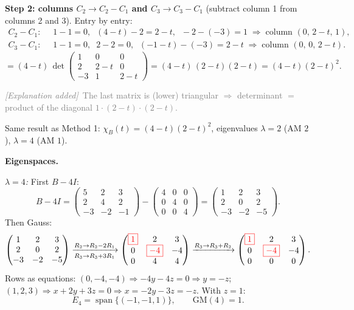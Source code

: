 \documentclass[a4paper,12pt]{article}
\newcommand{\piv}[1]{{\color{red}\boxed{#1}}}
\newcommand{\erglerk}{\textcolor{gray}{\small\textit{[Explanation added]}}}
\begin{document}
\textbf{Step 2: columns $C_2 \to C_2 - C_1$ and $C_3 \to C_3 - C_1$} (subtract column 1 from columns 2 and 3). Entry by entry:
\begin{align*}
C_2 - C_1:\;\; & 1-1 = 0,\;\; (4-t)-2 = 2-t,\;\; -2-(-3) = 1 \;\Rightarrow\; \text{column } (0,\, 2-t,\, 1), \\
C_3 - C_1:\;\; & 1-1 = 0,\;\; 2-2 = 0,\;\; (-1-t)-(-3) = 2-t \;\Rightarrow\; \text{column } (0,\, 0,\, 2-t).
\end{align*}
\[
= (4-t)\,\det\!\begin{pmatrix} 1 & 0 & 0 \\ 2 & 2-t & 0 \\ -3 & 1 & 2-t \end{pmatrix}
= (4-t)\,(2-t)(2-t) = (4-t)(2-t)^2.
\]

\erglerk\ \textcolor{gray}{\small The last matrix is (lower) triangular $\Rightarrow$ determinant $=$ product of the diagonal $1\cdot(2-t)\cdot(2-t)$.}

Same result as Method 1: $\chi_B(t) = (4-t)(2-t)^2$, eigenvalues $\lambda = 2$ (AM $2$), $\lambda = 4$ (AM $1$).

\medskip
\textbf{Eigenspaces.}

\textit{$\lambda = 4$:} First $B - 4I$:
\[
B - 4I = \begin{pmatrix} 5 & 2 & 3 \\ 2 & 4 & 2 \\ -3 & -2 & -1 \end{pmatrix} - \begin{pmatrix} 4 & 0 & 0 \\ 0 & 4 & 0 \\ 0 & 0 & 4 \end{pmatrix} = \begin{pmatrix} 1 & 2 & 3 \\ 2 & 0 & 2 \\ -3 & -2 & -5 \end{pmatrix}.
\]
Then Gauss:
\[
\begin{pmatrix} 1 & 2 & 3 \\ 2 & 0 & 2 \\ -3 & -2 & -5 \end{pmatrix}
\xrightarrow[R_3 \to R_3 + 3R_1]{R_2 \to R_2 - 2R_1}
\begin{pmatrix} \piv{1} & 2 & 3 \\ 0 & \piv{-4} & -4 \\ 0 & 4 & 4 \end{pmatrix}
\xrightarrow{R_3 \to R_3 + R_2}
\begin{pmatrix} \piv{1} & 2 & 3 \\ 0 & \piv{-4} & -4 \\ 0 & 0 & 0 \end{pmatrix}.
\]
Rows as equations: $(0,-4,-4) \Rightarrow -4y - 4z = 0 \Rightarrow y = -z$; \; $(1,2,3) \Rightarrow x + 2y + 3z = 0 \Rightarrow x = -2y - 3z = -z$. With $z=1$:
\[
E_4 = \operatorname{span}\{(-1,-1,1)\}, \qquad \text{GM}(4) = 1.
\]
\end{document}
